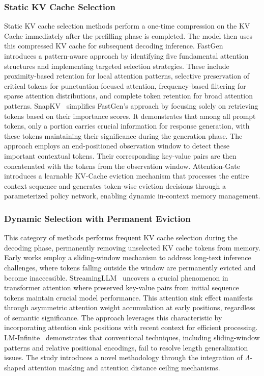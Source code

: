 \subsubsection{Static KV Cache Selection}\label{sssec:static_kv}
Static KV cache selection methods perform a one-time compression on the KV Cache 
immediately after the prefilling phase is completed. The model then uses this compressed KV
cache for subsequent decoding inference.
FastGen~\cite{DBLP:conf/iclr/Ge0LZ0024} introduces a pattern-aware approach by identifying five fundamental attention structures 
and implementing targeted selection strategies. These include proximity-based retention for 
local attention patterns, selective preservation of critical tokens for punctuation-focused 
attention, frequency-based filtering for sparse attention distributions, and complete token 
retention for broad attention patterns.
SnapKV~\cite{li2024snapkv} simplifies FastGen's approach by focusing solely on retrieving tokens 
based on their importance scores. It demonstrates that among all prompt tokens, only 
a portion carries crucial information for response generation, with these tokens 
maintaining their significance during the generation phase. The approach employs an 
end-positioned observation window to detect these important contextual tokens. 
Their corresponding key-value pairs are then concatenated with the tokens from the 
observation window.
Attention-Gate~\cite{DBLP:journals/corr/abs-2410-12876} introduces a learnable KV-Cache 
eviction mechanism that processes the entire context sequence and generates token-wise 
eviction decisions through a parameterized policy network, enabling dynamic in-context 
memory management.

\subsubsection{Dynamic Selection with Permanent Eviction}\label{sssec:dynamic_kv_permanent}
This category of methods performs frequent KV cache selection during the decoding phase, 
permanently removing unselected KV cache tokens from memory.
Early works employ a sliding-window mechanism to address long-text inference challenges, 
where tokens falling outside the window are permanently evicted and become inaccessible.
StreamingLLM~\cite{DBLP:conf/iclr/XiaoTCHL24} uncovers a crucial phenomenon 
in transformer attention where preserved key-value pairs from initial sequence 
tokens maintain crucial model performance. This attention sink effect manifests 
through asymmetric attention weight accumulation at early positions, regardless 
of semantic significance. The approach leverages this characteristic by 
incorporating attention sink positions with recent context for efficient processing.
LM-Infinite~\cite{DBLP:conf/naacl/HanWPX0JW24} demonstrates that conventional 
techniques, including sliding-window patterns and relative positional encodings, 
fail to resolve length generalization issues. The study introduces a novel methodology 
through the integration of $\Lambda$-shaped attention masking and attention distance 
ceiling mechanisms.

